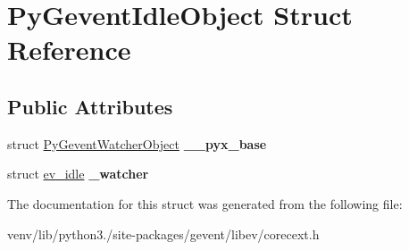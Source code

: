 \hypertarget{struct_py_gevent_idle_object}{}\section{Py\+Gevent\+Idle\+Object Struct Reference}
\label{struct_py_gevent_idle_object}
\subsection*{Public Attributes}
\begin{DoxyCompactItemize}
\item 
\mbox{\label{struct_py_gevent_idle_object_a54460160c151c23fa6eb8042344ae414}} 
struct \hyperlink{struct_py_gevent_watcher_object}{Py\+Gevent\+Watcher\+Object} {\bfseries \+\_\+\+\_\+pyx\+\_\+base}
\item 
\mbox{\label{struct_py_gevent_idle_object_ab8d011f099b132e6d35523831751f053}} 
struct \hyperlink{structev__idle}{ev\+\_\+idle} {\bfseries \+\_\+watcher}
\end{DoxyCompactItemize}


The documentation for this struct was generated from the following file\+:\begin{DoxyCompactItemize}
\item 
venv/lib/python3./site-\/packages/gevent/libev/corecext.\+h\end{DoxyCompactItemize}
